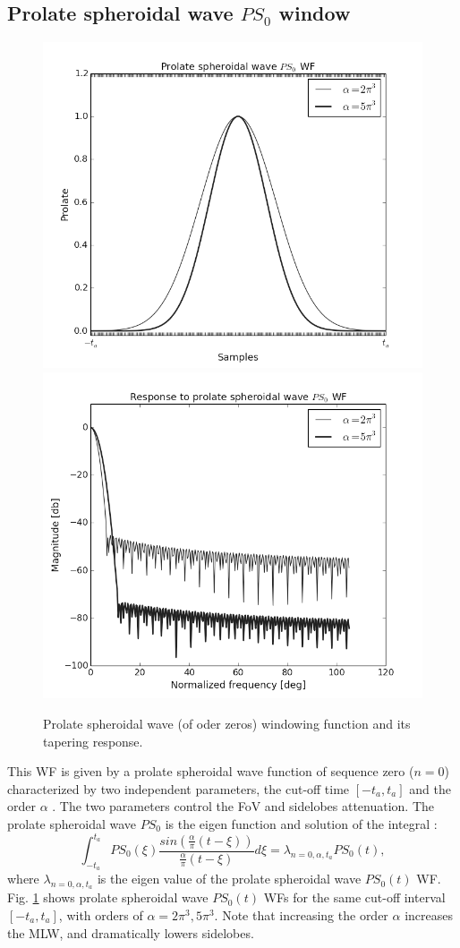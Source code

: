 \documentclass[useAMS,usenatbib]{mn2e}
\begin{document}
\subsection{Prolate spheroidal wave $PS_{0}$ window}
\begin{figure}
\includegraphics[width=.5\textwidth]{./Figures/prolategrey.png}%
\includegraphics[width=.5\textwidth]{./Figures/freq_resp_prolategrey.png}
\caption{Prolate spheroidal wave (of oder zeros) windowing function and its tapering response.}\label{fig:wf:prolate}
\end{figure}
This WF is given by a prolate spheroidal wave function of sequence zero ($n=0$) characterized
by two independent parameters, the cut-off time $[-t_a,t_a]$ and the order $\alpha$ 
\citep{landau1978prolate,delsarte1985discrete}. 
The two parameters control the  FoV and sidelobes attenuation.
The prolate spheroidal wave $PS_0$ is the eigen function and solution of the integral :
\begin{equation}
\int_{-t_a}^{t_a} PS_{0}(\xi) \frac{sin(\frac{\alpha}{\pi}(t-\xi))}{\frac{\alpha}{\pi}(t-\xi)}d\xi=\lambda_{n=0,\alpha,t_a}PS_{0}(t), 
 \end{equation}
where $\lambda_{n=0,\alpha,t_a}$ is the eigen value of the prolate spheroidal wave $PS_{0}(t)$ WF.
Fig. \ref{fig:wf:prolate} shows prolate spheroidal wave $PS_0(t)$ WFs for the same cut-off interval $[-t_a,t_a]$, 
with orders of $\alpha=2\pi^3, 5\pi^3$. Note that increasing 
the order $\alpha$ increases the MLW, and dramatically lowers sidelobes.
\end{document}
